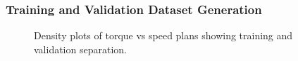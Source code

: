 \documentclass{beamer}
\begin{document}
\begin{frame}
\frametitle{Training and Validation Dataset Generation}

\begin{figure}[ht!]
    \centering
    \caption{Density plots of torque vs speed plans showing training and validation separation.}
    \label{fig:zones}
    \vspace{-1em}
\end{figure}

\end{frame}
\end{document}
